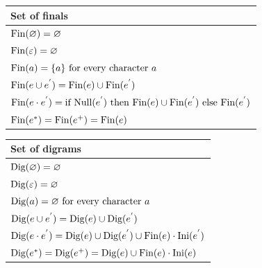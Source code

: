 \begin{table}[H]
    \centering
    \begin{tabular}{l}
    \hline
    \textbf{Set of finals}                                                                                                                              \\ \hline
    $\textnormal{Fin}(\varnothing)=\varnothing$                                                                                                         \\
    $\textnormal{Fin}(\varepsilon)=\varnothing$                                                                                                         \\
    $\textnormal{Fin}(a)=\{a\} \textnormal{ for every character }a$                                                                                     \\
    $\textnormal{Fin}(e \cup e^{'})=\textnormal{Fin}(e) \cup \textnormal{Fin}(e^{'})$                                                                   \\
    $\textnormal{Fin}(e \cdot e^{'})=\textnormal{if Null}(e^{'}) \textnormal{ then Fin}(e)\cup\textnormal{Fin}(e^{'}) \textnormal{ else Fin}(e^{'})$    \\
    $\textnormal{Fin}(e^{*})=\textnormal{Fin}(e^{+})=\textnormal{Fin}(e)$                                                                               \\ \hline
    \end{tabular}
\end{table}
\begin{table}[H]
    \centering
    \begin{tabular}{l}
    \hline
    \textbf{Set of digrams}                                                                                                                              \\ \hline
    $\textnormal{Dig}(\varnothing)=\varnothing$                                                                                                         \\
    $\textnormal{Dig}(\varepsilon)=\varnothing$                                                                                                         \\
    $\textnormal{Dig}(a)=\varnothing \textnormal{ for every character }a$                                                                                     \\
    $\textnormal{Dig}(e \cup e^{'})=\textnormal{Dig}(e) \cup \textnormal{Dig}(e^{'})$                                                                   \\
    $\textnormal{Dig}(e \cdot e^{'})=\textnormal{Dig}(e) \cup \textnormal{Dig}(e^{'}) \cup \textnormal{Fin}(e) \cdot \textnormal{Ini}(e^{'})$    \\
    $\textnormal{Dig}(e^{*})=\textnormal{Dig}(e^{+})=\textnormal{Dig}(e) \cup \textnormal{Fin}(e) \cdot \textnormal{Ini}(e)$                                                                               \\ \hline
    \end{tabular}
\end{table}

